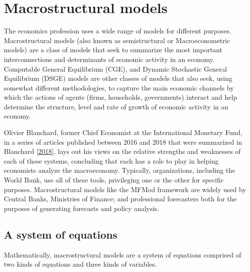 \documentclass[letterpaper,10pt,english]{jupyterBook}
\begin{document}
\chapter{Macrostructural models}
\label{\detokenize{content/02_MacrostructuralModels/MacroStructuralModels:macrostructural-models}}\label{\detokenize{content/02_MacrostructuralModels/MacroStructuralModels::doc}}
\sphinxAtStartPar
The economics profession uses a wide range of models for different purposes.  Macro\sphinxhyphen{}structural models (also known as semi\sphinxhyphen{}structural or Macro\sphinxhyphen{}econometric models) are a class of models that seek to summarize the most important interconnections and determinants of economic activity in an economy. Computable General Equilibrium (CGE), and Dynamic Stochastic General Equilibrium (DSGE) models are other classes of models that also seek, using somewhat different methodologies, to capture the main economic channels by which the actions of agents (firms, households, governments) interact and help determine the structure, level and rate of growth of economic activity in an economy.

\sphinxAtStartPar
Olivier Blanchard, former Chief Economist at the International Monetary Fund, in a series of articles published between 2016 and 2018 that were summarized in Blanchard {[}\hyperlink{cite.content/99_BackMatter/References:id17}{2018}{]}, lays out his views on the relative strengths and weaknesses of each of these systems, concluding that each has a role to play in helping economists analyze the macro\sphinxhyphen{}economy. Typically, organizations, including the World Bank, use all of these tools, privileging one or the other for specific purposes. Macrostructural models like the MFMod framework are widely used by Central Banks, Ministries of Finance; and professional forecasters both for the purposes of generating forecasts and policy analysis.


\section{A system of equations}
\label{\detokenize{content/02_MacrostructuralModels/MacroStructuralModels:a-system-of-equations}}
\sphinxAtStartPar
Mathematically, macro\sphinxhyphen{}structural models are a system of equations comprised of two kinds of equations and three kinds of variables.
\end{document}
